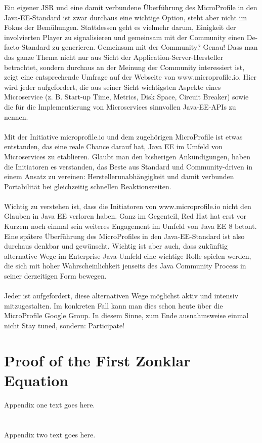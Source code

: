 Ein eigener JSR und eine damit verbundene Überführung des MicroProfile in den Java-EE-Standard ist zwar durchaus eine wichtige Option, steht aber nicht im Fokus der Bemühungen. Stattdessen geht es vielmehr darum, Einigkeit der involvierten Player zu signalisieren und gemeinsam mit der Community einen De-facto-Standard zu generieren. Gemeinsam mit der Community? Genau! Dass man das ganze Thema nicht nur aus Sicht der Application-Server-Hersteller betrachtet, sondern durchaus an der Meinung der Community interessiert ist, zeigt eine entsprechende Umfrage auf der Webseite von www.microprofile.io. Hier wird jeder aufgefordert, die aus seiner Sicht wichtigsten Aspekte eines Microservice (z. B. Start-up Time, Metrics, Disk Space, Circuit Breaker) sowie die für die Implementierung von Microservices sinnvollen Java-EE-APIs zu nennen. \\ \\
Mit der Initiative microprofile.io und dem zugehörigen MicroProfile ist etwas entstanden, das eine reale Chance darauf hat, Java EE im Umfeld von Microservices zu etablieren. Glaubt man den bisherigen Ankündigungen, haben die Initiatoren es verstanden, das Beste aus Standard und Community-driven in einem Ansatz zu vereinen: Herstellerunabhängigkeit und damit verbunden Portabilität bei gleichzeitig schnellen Reaktionszeiten.\\ \\
Wichtig zu verstehen ist, dass die Initiatoren von www.microprofile.io nicht den Glauben in Java EE verloren haben. Ganz im Gegenteil, Red Hat hat erst vor Kurzem noch einmal sein weiteres Engagement im Umfeld von Java EE 8 betont. Eine spätere Überführung des MicroProfiles in den Java-EE-Standard ist also durchaus denkbar und gewünscht. Wichtig ist aber auch, dass zukünftig alternative Wege im Enterprise-Java-Umfeld eine wichtige Rolle spielen werden, die sich mit hoher Wahrscheinlichkeit jenseits des Java Community Process in seiner derzeitigen Form bewegen.\\ \\
Jeder ist aufgefordert, diese alternativen Wege möglichst aktiv und intensiv mitzugestalten. Im konkreten Fall kann man dies schon heute über die MicroProfile Google Group. In diesem Sinne, zum Ende ausnahmsweise einmal nicht Stay tuned, sondern: Participate!



\appendices
\section{Proof of the First Zonklar Equation}
Appendix one text goes here.

\section{}
Appendix two text goes here.


\ifCLASSOPTIONcaptionsoff
  \newpage
\fi